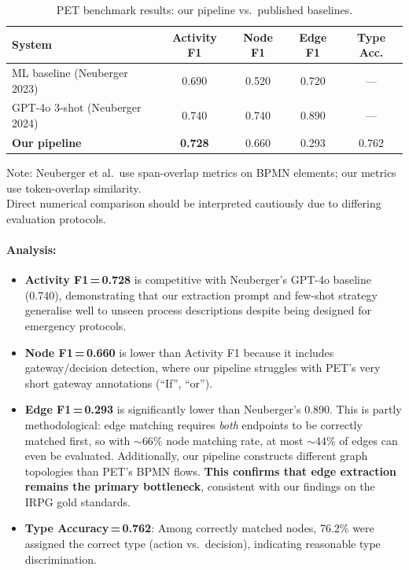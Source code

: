 \documentclass[12pt,a4paper]{article}
\begin{document}
\begin{table}[H]
\centering
\caption{PET benchmark results: our pipeline vs.\ published baselines.}
\label{tab:pet-results}
\begin{tabular}{l c c c c}
\toprule
\textbf{System} & \textbf{Activity F1} & \textbf{Node F1} & \textbf{Edge F1} & \textbf{Type Acc.} \\
\midrule
ML baseline (Neuberger 2023)       & 0.690 & 0.520 & 0.720 & --- \\
GPT-4o 3-shot (Neuberger 2024)     & 0.740 & 0.740 & 0.890 & --- \\
\midrule
\textbf{Our pipeline}              & \textbf{0.728} & 0.660 & 0.293 & 0.762 \\
\bottomrule
\end{tabular}

\smallskip
\footnotesize Note: Neuberger et al.\ use span-overlap metrics on BPMN elements; our metrics use token-overlap similarity. \\ Direct numerical comparison should be interpreted cautiously due to differing evaluation protocols.
\end{table}

\paragraph{Analysis:}
\begin{itemize}[leftmargin=2em]
    \item \textbf{Activity F1\,=\,0.728} is competitive with Neuberger's GPT-4o baseline (0.740), demonstrating that our extraction prompt and few-shot strategy generalise well to unseen process descriptions despite being designed for emergency protocols.
    \item \textbf{Node F1\,=\,0.660} is lower than Activity F1 because it includes gateway/decision detection, where our pipeline struggles with PET's very short gateway annotations (``If'', ``or'').
    \item \textbf{Edge F1\,=\,0.293} is significantly lower than Neuberger's 0.890. This is partly methodological: edge matching requires \emph{both} endpoints to be correctly matched first, so with $\sim$66\% node matching rate, at most $\sim$44\% of edges can even be evaluated. Additionally, our pipeline constructs different graph topologies than PET's BPMN flows. \textbf{This confirms that edge extraction remains the primary bottleneck}, consistent with our findings on the IRPG gold standards.
    \item \textbf{Type Accuracy\,=\,0.762}: Among correctly matched nodes, 76.2\% were assigned the correct type (action vs.\ decision), indicating reasonable type discrimination.
\end{itemize}
\end{document}
